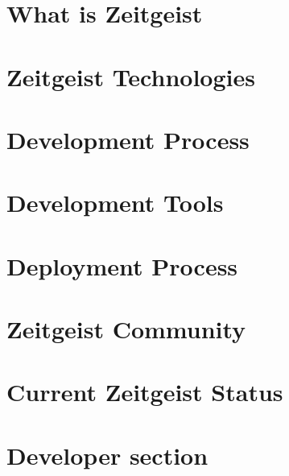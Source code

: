 \documentclass[10pt]{book}
\begin{document}


\tableofcontents

\chapter{What is Zeitgeist}


\chapter{Zeitgeist Technologies}


\chapter{Development Process}


\chapter{Development Tools}


\chapter{Deployment Process}


\chapter{Zeitgeist Community}


\chapter{Current Zeitgeist Status}


\chapter{Developer section}

\end{document}
